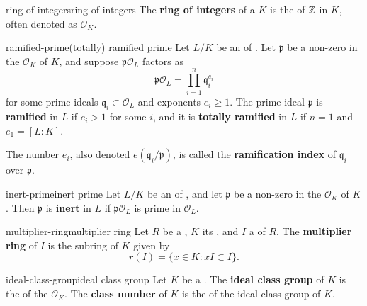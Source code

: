 \begin{topic}{ring-of-integers}{ring of integers}
    The \textbf{ring of integers} of a  $K$ is the  of $\mathbb{Z}$ in $K$, often denoted as $\mathcal{O}_K$. %
\end{topic}

\begin{topic}{ramified-prime}{(totally) ramified prime}
    Let $L/K$ be an  of . Let $\mathfrak{p}$ be a non-zero  in the  $\mathcal{O}_K$ of $K$, and suppose $\mathfrak{p} \mathcal{O}_L$ factors as
    \[ \mathfrak{p} \mathcal{O}_L = \prod_{i = 1}^{n} \mathfrak{q}_i^{e_i} \]
    for some prime ideals $\mathfrak{q}_i \subset \mathcal{O}_L$ and exponents $e_i \ge 1$.
    The prime ideal $\mathfrak{p}$ is \textbf{ramified} in $L$ if $e_i > 1$ for some $i$, and it is \textbf{totally ramified} in $L$ if $n = 1$ and $e_1 = [L : K]$.
    
    The number $e_i$, also denoted $e(\mathfrak{q}_i / \mathfrak{p})$, is called the \textbf{ramification index} of $\mathfrak{q}_i$ over $\mathfrak{p}$.
\end{topic}

\begin{topic}{inert-prime}{inert prime}
    Let $L/K$ be an  of , and let $\mathfrak{p}$ be a non-zero  in the  $\mathcal{O}_K$ of $K$. Then $\mathfrak{p}$ is \textbf{inert} in $L$ if $\mathfrak{p} \mathcal{O}_L$ is prime in $\mathcal{O}_L$.
\end{topic}

\begin{topic}{multiplier-ring}{multiplier ring}
    Let $R$ be a , $K$ its , and $I$ a  of $R$. The \textbf{multiplier ring} of $I$ is the subring of $K$ given by
    \[ r(I) = \{ x \in K : x I \subset I \} . \]
\end{topic}

\begin{topic}{ideal-class-group}{ideal class group}
    Let $K$ be a . The \textbf{ideal class group} of $K$ is the  of the  $\mathcal{O}_K$.
    The \textbf{class number} of $K$ is the  of the ideal class group of $K$.
\end{topic}


